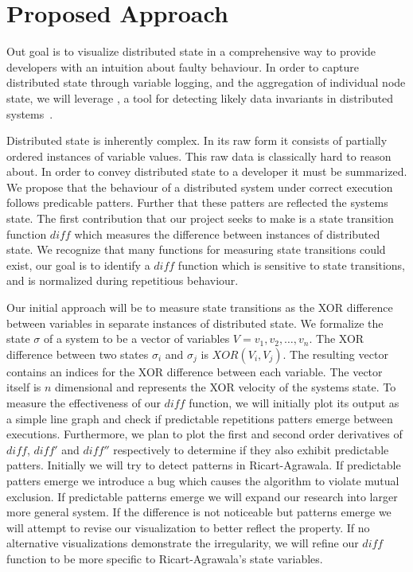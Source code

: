 \section{Proposed Approach}
\label{sec:proposed-approach}

Out goal is to visualize distributed state in a comprehensive way to
provide developers with an intuition about faulty behaviour. In order
to capture distributed state through variable logging, and the
aggregation of individual node state, we will leverage \dinv, a tool
for detecting likely data invariants in distributed
systems~\cite{dinv}.

Distributed state is inherently complex. In its raw form it consists
of partially ordered instances of variable values. This raw data is
classically hard to reason about. In order to convey distributed state
to a developer it must be summarized. We propose that the behaviour of
a distributed system under correct execution follows predicable
patters. Further that these patters are reflected the systems state.
The first contribution that our project seeks to make is a state
transition function $diff$ which measures the difference between
instances of distributed state. We recognize that many functions for
measuring state transitions could exist, our goal is to identify a
$diff$ function which is sensitive to state transitions, and is
normalized during repetitious behaviour.

Our initial approach will be to measure state transitions as the XOR
difference between variables in separate instances of distributed
state. We formalize the state $\sigma$ of a system to be a vector of
variables $V = {v_1,v_2,\dots,v_n}$. The XOR difference between two
states $\sigma_i$ and $\sigma_j$ is $XOR(V_i,V_j)$. The resulting
vector contains an indices for the XOR difference between each
variable. The vector itself is $n$ dimensional and represents the XOR
velocity of the systems state. To measure the effectiveness of our
$diff$ function, we will initially plot its output as a simple line
graph and check if predictable repetitions patters emerge between
executions.  Furthermore, we plan to plot the first and second order
derivatives of $diff$, $diff'$ and $diff''$ respectively to determine
if they also exhibit predictable patters. Initially we will try to
detect patterns in Ricart-Agrawala. If predictable patters emerge we
introduce a bug which causes the algorithm to violate mutual
exclusion. If predictable patterns emerge we will expand our research
into larger more general system. If the difference is not noticeable
but patterns emerge we will attempt to revise our visualization to
better reflect the property. If no alternative visualizations
demonstrate the irregularity, we will refine our $diff$ function to be
more specific to Ricart-Agrawala's state variables.
